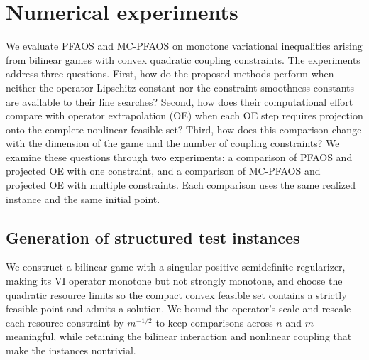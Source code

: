 \section{Numerical experiments}\label{sec:numerical_experiments}

We evaluate PFAOS and MC-PFAOS on monotone variational inequalities arising
from bilinear games with convex quadratic coupling constraints. The
experiments address three questions. First, how do the proposed methods
perform when neither the operator Lipschitz constant nor the constraint
smoothness constants are available to their line searches? Second, how
does their computational effort compare with operator extrapolation (OE)
when each OE step requires projection onto the complete nonlinear feasible
set? Third, how does this comparison change with the dimension of the game
and the number of coupling constraints? We examine these questions through
two experiments: a comparison of PFAOS and projected OE with one constraint,
and a comparison of MC-PFAOS and projected OE with multiple constraints.
Each comparison uses the same realized instance and the same initial point.

\subsection{Generation of structured test instances}\label{subsec:numerical_instances}

We construct a bilinear game with a singular positive semidefinite regularizer,
making its VI operator monotone but not strongly monotone, and choose the
quadratic resource limits so the compact convex feasible set contains a
strictly feasible point and admits a solution. We bound the operator's scale
and rescale each resource constraint by $m^{-1/2}$ to keep comparisons across
$n$ and $m$ meaningful, while retaining the bilinear interaction and nonlinear
coupling that make the instances nontrivial.

